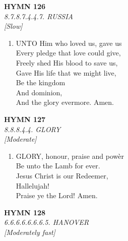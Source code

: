 \documentclass[11pt,a4paper]{article}
\begin{document}
\newpage
\begin{center}
    {\Large \textbf{HYMN 126}}
    \\
    \textit{8.7.8.7.4.4.7. RUSSIA}
    \\
    \textit{\small [Slow]}
\end{center}
\vspace{1em}

\begin{enumerate}
    \item UNTO Him who loved us, gave us \\
        Every pledge that love could give, \\
        Freely shed His blood to save us, \\
        Gave His life that we might live, \\
        Be the kingdom \\
        And dominion, \\
        And the glory evermore. Amen.

\end{enumerate}

\newpage
\begin{center}
    {\Large \textbf{HYMN 127}}
    \\
    \textit{8.8.8.4.4. GLORY}
    \\
    \textit{\small [Moderate]}
\end{center}
\vspace{1em}

\begin{enumerate}
    \item GLORY, honour, praise and pow\`er \\
        Be unto the Lamb for ever. \\
        Jesus Christ is our Redeemer, \\
        Hallelujah! \\
        Praise ye the Lord! Amen.

\end{enumerate}

\newpage
\begin{center}
    {\Large \textbf{HYMN 128}}
    \\
    \textit{6.6.6.6.6.6.6.5. HANOVER}
    \\
    \textit{\small [Moderately fast]}
\end{center}
\vspace{1em}
\end{document}
